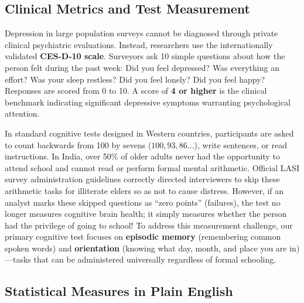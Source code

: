\subsection{Clinical Metrics and Test Measurement}

\begin{description}[leftmargin=0.5cm, style=nextline]
    \item[\textbf{1. Measuring Depression: The 10-Item CES-D Scale:}]
    Depression in large population surveys cannot be diagnosed through private clinical psychiatric evaluations. Instead, researchers use the internationally validated \textbf{CES-D-10 scale}. Surveyors ask 10 simple questions about how the person felt during the past week: Did you feel depressed? Was everything an effort? Was your sleep restless? Did you feel lonely? Did you feel happy? Responses are scored from 0 to 10. A score of \textbf{4 or higher} is the clinical benchmark indicating significant depressive symptoms warranting psychological attention.

    \item[\textbf{2. Measuring Cognition and The ``Item-Skip'' Challenge:}]
    In standard cognitive tests designed in Western countries, participants are asked to count backwards from 100 by sevens ($100, 93, 86\dots$), write sentences, or read instructions. In India, over 50\% of older adults never had the opportunity to attend school and cannot read or perform formal mental arithmetic. Official LASI survey administration guidelines correctly directed interviewers to skip these arithmetic tasks for illiterate elders so as not to cause distress. However, if an analyst marks these skipped questions as ``zero points'' (failures), the test no longer measures cognitive brain health; it simply measures whether the person had the privilege of going to school! To address this measurement challenge, our primary cognitive test focuses on \textbf{episodic memory} (remembering common spoken words) and \textbf{orientation} (knowing what day, month, and place you are in)—tasks that can be administered universally regardless of formal schooling.
\end{description}

\subsection{Statistical Measures in Plain English}


